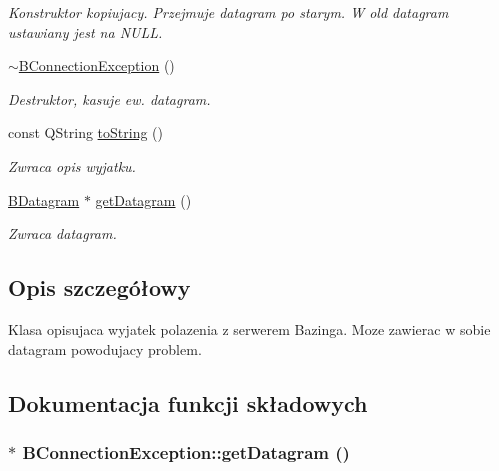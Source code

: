 \begin{DoxyCompactItemize}
\begin{DoxyCompactList}\small\item\em Konstruktor kopiujacy. Przejmuje datagram po starym. W old datagram ustawiany jest na NULL. \item\end{DoxyCompactList}\item 
\hypertarget{class_b_connection_exception_aba3b955d554c45bbd279bd75e65e74f5}{
\hyperlink{class_b_connection_exception_aba3b955d554c45bbd279bd75e65e74f5}{$\sim$BConnectionException} ()}
\label{class_b_connection_exception_aba3b955d554c45bbd279bd75e65e74f5}

\begin{DoxyCompactList}\small\item\em Destruktor, kasuje ew. datagram. \item\end{DoxyCompactList}\item 
const QString \hyperlink{class_b_connection_exception_a645db90a648e008820d2506a67aca2ec}{toString} ()
\begin{DoxyCompactList}\small\item\em Zwraca opis wyjatku. \item\end{DoxyCompactList}\item 
\hyperlink{class_b_datagram}{BDatagram} $\ast$ \hyperlink{class_b_connection_exception_a430b5f1f10ea49111da8ad333ec9344f}{getDatagram} ()
\begin{DoxyCompactList}\small\item\em Zwraca datagram. \item\end{DoxyCompactList}\end{DoxyCompactItemize}


\subsection{Opis szczegółowy}
Klasa opisujaca wyjatek polazenia z serwerem Bazinga. Moze zawierac w sobie datagram powodujacy problem. 

\subsection{Dokumentacja funkcji składowych}
\hypertarget{class_b_connection_exception_a430b5f1f10ea49111da8ad333ec9344f}{
\subsubsection[{getDatagram}]{ $\ast$ BConnectionException::getDatagram ()}}
\label{class_b_connection_exception_a430b5f1f10ea49111da8ad333ec9344f}


